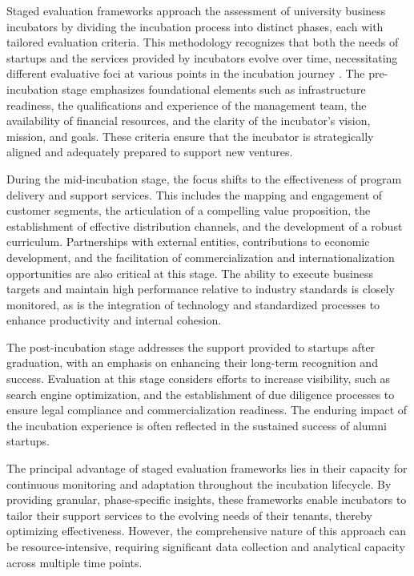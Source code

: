\documentclass[../Main.tex]{subfiles}
\begin{document}
Staged evaluation frameworks approach the assessment of university business incubators by dividing the incubation process into distinct phases, each with tailored evaluation criteria. This methodology recognizes that both the needs of startups and the services provided by incubators evolve over time, necessitating different evaluative foci at various points in the incubation journey \autocite{Amelia_EvaluationFramework}. The pre-incubation stage emphasizes foundational elements such as infrastructure readiness, the qualifications and experience of the management team, the availability of financial resources, and the clarity of the incubator's vision, mission, and goals. These criteria ensure that the incubator is strategically aligned and adequately prepared to support new ventures.

During the mid-incubation stage, the focus shifts to the effectiveness of program delivery and support services. This includes the mapping and engagement of customer segments, the articulation of a compelling value proposition, the establishment of effective distribution channels, and the development of a robust curriculum. Partnerships with external entities, contributions to economic development, and the facilitation of commercialization and internationalization opportunities are also critical at this stage. The ability to execute business targets and maintain high performance relative to industry standards is closely monitored, as is the integration of technology and standardized processes to enhance productivity and internal cohesion.

The post-incubation stage addresses the support provided to startups after graduation, with an emphasis on enhancing their long-term recognition and success. Evaluation at this stage considers efforts to increase visibility, such as search engine optimization, and the establishment of due diligence processes to ensure legal compliance and commercialization readiness. The enduring impact of the incubation experience is often reflected in the sustained success of alumni startups.

The principal advantage of staged evaluation frameworks lies in their capacity for continuous monitoring and adaptation throughout the incubation lifecycle. By providing granular, phase-specific insights, these frameworks enable incubators to tailor their support services to the evolving needs of their tenants, thereby optimizing effectiveness. However, the comprehensive nature of this approach can be resource-intensive, requiring significant data collection and analytical capacity across multiple time points.
\end{document}
